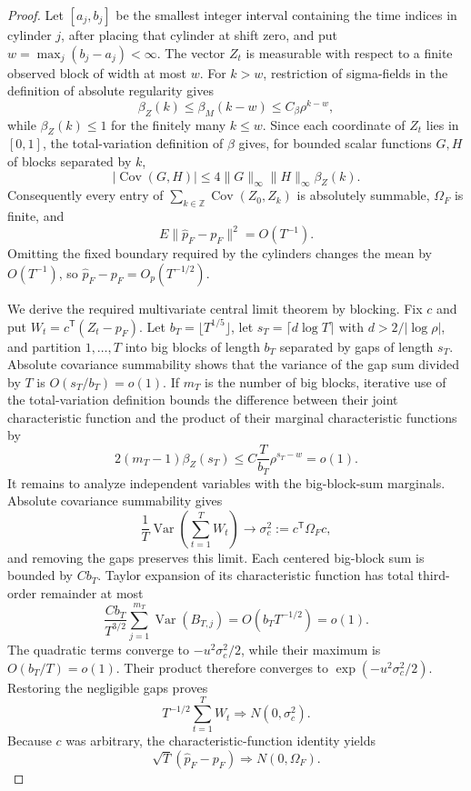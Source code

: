 \documentclass{article}
\begin{document}
\begin{proof}
Let \([a_j,b_j]\) be the smallest integer interval containing the time indices in cylinder \(j\), after placing that cylinder at shift zero, and put \(w=\max_j(b_j-a_j)<\infty\).  The vector \(Z_t\) is measurable with respect to a finite observed block of width at most \(w\).  For \(k>w\), restriction of sigma-fields in the definition of absolute regularity gives
\[
 \beta_Z(k)\le\beta_M(k-w)\le C_\beta\rho^{k-w},
\]
while \(\beta_Z(k)\le1\) for the finitely many \(k\le w\).  Since each coordinate of \(Z_t\) lies in \([0,1]\), the total-variation definition of \(\beta\) gives, for bounded scalar functions \(G,H\) of blocks separated by \(k\),
\[
 |\operatorname{Cov}(G,H)|
 \le4\lVert G\rVert_\infty\lVert H\rVert_\infty\beta_Z(k).
\]
Consequently every entry of \(\sum_{k\in\mathbb Z}\operatorname{Cov}(Z_0,Z_k)\) is absolutely summable, \(\Omega_F\) is finite, and
\[
 E\lVert\widehat p_F-p_F\rVert^2=O(T^{-1}).
\]
Omitting the fixed boundary required by the cylinders changes the mean by \(O(T^{-1})\), so \(\widehat p_F-p_F=O_p(T^{-1/2})\).

We derive the required multivariate central limit theorem by blocking.  Fix \(c\) and put \(W_t=c^{\mathsf T}(Z_t-p_F)\).  Let \(b_T=\lfloor T^{1/5}\rfloor\), let \(s_T=\lceil d\log T\rceil\) with \(d>2/|\log\rho|\), and partition \(1,\ldots,T\) into big blocks of length \(b_T\) separated by gaps of length \(s_T\).  Absolute covariance summability shows that the variance of the gap sum divided by \(T\) is \(O(s_T/b_T)=o(1)\).  If \(m_T\) is the number of big blocks, iterative use of the total-variation definition bounds the difference between their joint characteristic function and the product of their marginal characteristic functions by
\[
 2(m_T-1)\beta_Z(s_T)
 \le C\frac{T}{b_T}\rho^{s_T-w}=o(1).
\]
It remains to analyze independent variables with the big-block-sum marginals.  Absolute covariance summability gives
\[
 \frac1T\operatorname{Var}\!\left(\sum_{t=1}^T W_t\right)
 \longrightarrow \sigma_c^2:=c^{\mathsf T}\Omega_Fc,
\]
and removing the gaps preserves this limit.  Each centered big-block sum is bounded by \(Cb_T\).  Taylor expansion of its characteristic function has total third-order remainder at most
\[
 \frac{Cb_T}{T^{3/2}}\sum_{j=1}^{m_T}\operatorname{Var}(B_{T,j})
 =O(b_TT^{-1/2})=o(1).
\]
The quadratic terms converge to \(-u^2\sigma_c^2/2\), while their maximum is \(O(b_T/T)=o(1)\).  Their product therefore converges to \(\exp(-u^2\sigma_c^2/2)\).  Restoring the negligible gaps proves
\[
 T^{-1/2}\sum_{t=1}^T W_t\Rightarrow N(0,\sigma_c^2).
\]
Because \(c\) was arbitrary, the characteristic-function identity yields
\[
 \sqrt T(\widehat p_F-p_F)\Rightarrow N(0,\Omega_F).
\]


\end{proof}
\end{document}
